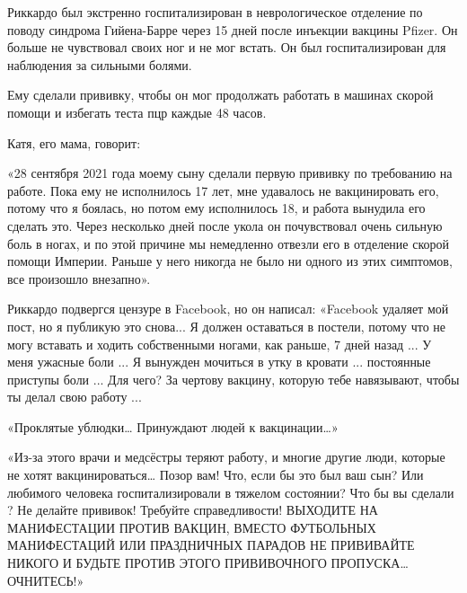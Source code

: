 Риккардо был экстренно госпитализирован в неврологическое отделение по поводу
синдрома Гийена-Барре через 15 дней после инъекции вакцины Pfizer. Он больше не
чувствовал своих ног и не мог встать. Он был госпитализирован для наблюдения за
сильными болями.

Ему сделали прививку, чтобы он мог продолжать работать в машинах скорой помощи и
избегать теста пцр каждые 48 часов.

Катя, его мама, говорит:

«28 сентября 2021 года моему сыну сделали первую прививку по требованию на
работе. Пока ему не исполнилось 17 лет, мне удавалось не вакцинировать его,
потому что я боялась, но потом ему исполнилось 18, и работа вынудила его сделать
это. Через несколько дней после укола он почувствовал очень сильную боль в
ногах, и по этой причине мы немедленно отвезли его в отделение скорой помощи
Империи. Раньше у него никогда не было ни одного из этих симптомов, все
произошло внезапно».

Риккардо подвергся цензуре в Facebook, но он написал: «Facebook удаляет мой
пост, но я публикую это снова... Я должен оставаться в постели, потому что не
могу вставать и ходить собственными ногами, как раньше, 7 дней назад ... У меня
ужасные боли ... Я вынужден мочиться в утку в кровати ... постоянные приступы
боли ... Для чего? За чертову вакцину, которую тебе навязывают, чтобы ты делал
свою работу ...

«Проклятые ублюдки… Принуждают людей к вакцинации…»

«Из-за этого врачи и медсёстры теряют работу, и многие другие люди, которые не
хотят вакцинироваться… Позор вам! Что, если бы это был ваш сын? Или любимого
человека госпитализировали в тяжелом состоянии? Что бы вы сделали ? Не делайте
прививок! Требуйте справедливости! ВЫХОДИТЕ НА МАНИФЕСТАЦИИ ПРОТИВ ВАКЦИН,
ВМЕСТО ФУТБОЛЬНЫХ МАНИФЕСТАЦИЙ ИЛИ ПРАЗДНИЧНЫХ ПАРАДОВ НЕ ПРИВИВАЙТЕ НИКОГО И
БУДЬТЕ ПРОТИВ ЭТОГО ПРИВИВОЧНОГО ПРОПУСКА… ОЧНИТЕСЬ!»
